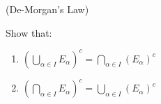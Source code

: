 (De-Morgan's Law)

Show that:

\begin{enumerate}
	\item $(\bigcup_{\alpha \in I} E_\alpha)^c = \bigcap_{\alpha \in I}(E_{\alpha})^c$
	\item $(\bigcap_{\alpha \in I}E_\alpha)^c = \bigcup_{\alpha \in I}(E_\alpha)^c$
\end{enumerate}



\begin{solution}$ $
	
\end{solution}